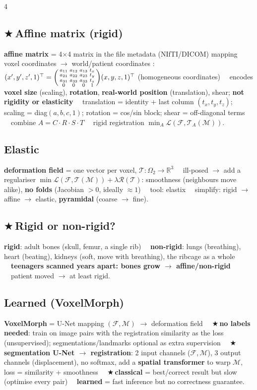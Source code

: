 \documentclass[a4paper]{article}
\newcommand{\K}[1]{\textcolor{kg}{\textbf{#1}}}
\newcommand{\F}[1]{\textcolor{fb}{#1}}
\newcommand{\T}[1]{\textcolor{tr}{\textbf{#1}}}
\newcommand{\X}{\textcolor{tr}{$\bigstar$}\,}
\newcommand{\D}{\unskip\ \textbf{\textbullet}\ \ignorespaces}
\newcommand{\ra}{\ensuremath{\to}}
\newcommand{\Om}{\Omega}
\begin{document}
\begin{multicols*}{4}
\subsection{\X Affine matrix (rigid)}
\K{affine matrix} = 4$\times$4 matrix in the file metadata (NIfTI/DICOM) mapping voxel coordinates \ra{} world/patient coordinates : \F{$(x',y',z',1)^\top=\begin{psmallmatrix}a_{11}&a_{12}&a_{13}&t_x\\a_{21}&a_{22}&a_{23}&t_y\\a_{31}&a_{32}&a_{33}&t_z\\0&0&0&1\end{psmallmatrix}(x,y,z,1)^\top$} (homogeneous coordinates) \D encodes \K{voxel size} (scaling), \K{rotation}, \K{real-world position} (translation), shear; \T{not rigidity or elasticity} \D translation = identity + last column $(t_x,t_y,t_z)$; scaling = diag$(a,b,c,1)$; rotation = cos/sin block; shear = off-diagonal terms \D combine \F{$A=C\cdot R\cdot S\cdot T$} \D rigid registration \F{$\min_A\mathcal L(\mathcal F,\mathcal T_A(\mathcal M))$}.

\subsection{Elastic}
\K{deformation field} = one vector per voxel, $\mathcal T:\Om_2\to\mathbb R^3$ \D ill-posed \ra{} add a regulariser \F{$\min\mathcal L(\mathcal F,\mathcal T(\mathcal M))+\lambda\mathcal R(\mathcal T)$}: smoothness (neighbours move alike), \K{no folds} (Jacobian $>0$, ideally $\approx1$) \D tool: elastix \D simplify: rigid \ra{} affine \ra{} elastic, \K{pyramidal} (coarse \ra{} fine).

\subsection{\X Rigid or non-rigid?}
\K{rigid}: adult bones (skull, femur, a single rib) \D \K{non-rigid}: lungs (breathing), heart (beating), kidneys (soft, move with breathing), the ribcage as a whole \D \T{teenagers scanned years apart: bones grow \ra{} affine/non-rigid} \D patient moved \ra{} at least rigid.

\subsection{Learned (VoxelMorph)}
\K{VoxelMorph} = U-Net mapping $(\mathcal F,\mathcal M)$ \ra{} deformation field \D \X\T{no labels needed}: train on image pairs with the registration similarity as the loss (unsupervised); segmentations/landmarks optional as extra supervision \D \X\K{segmentation U-Net \ra{} registration}: 2 input channels ($\mathcal F,\mathcal M$), 3 output channels (displacement), no softmax, add a \K{spatial transformer} to warp $\mathcal M$, loss = similarity + smoothness \D \X\K{classical} = best/correct result but slow (optimise every pair) \D \K{learned} = fast inference but no correctness guarantee.


\end{multicols*}
\end{document}
